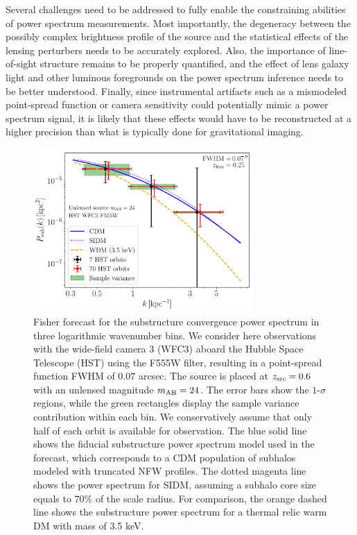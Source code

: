 \documentclass[modern,linenumbers]{aastex62}
\begin{document}
Several challenges need to be addressed to fully enable the constraining abilities of power spectrum measurements. Most importantly, the degeneracy between the possibly complex brightness profile of the source and the statistical effects of the lensing perturbers needs to be accurately explored. Also, the importance of line-of-sight structure remains to be properly quantified, and the effect of lens galaxy light and other luminous foregrounds on the power spectrum inference needs to be better understood. Finally, since instrumental artifacts such as a mismodeled point-spread function or camera sensitivity could potentially mimic a power spectrum signal, it is likely that these effects would have to be reconstructed at a higher precision than what is typically done for gravitational imaging. 

\begin{figure}
\centering
\includegraphics[width=0.75\textwidth]{figures/Fisher_space_Pk_SIDM_rev.pdf}
\caption{Fisher forecast for the substructure convergence power spectrum in three logarithmic wavenumber bins. We consider here observations with the wide-field camera 3 (WFC3) aboard the Hubble Space Telescope (HST) using the F555W filter, resulting in a point-spread function FWHM of $0.07$ arcsec. The source is placed at $z_{\rm src}=0.6$ with an unlensed magnitude $m_{\rm AB}=24$. The error bars show the $1$-$\sigma$ regions, while the green rectangles display the sample variance contribution within each bin. We conservatively assume that only half of each orbit is available for observation. The blue solid line shows the fiducial substructure power spectrum model used in the forecast, which corresponds to a CDM population of subhalos modeled with truncated NFW profiles. The dotted magenta line shows the power spectrum for SIDM, assuming a subhalo core size equals to $70\%$ of the scale radius. For comparison, the orange dashed line shows the substructure power spectrum for a thermal relic warm DM with mass of 3.5 keV. \label{fig:pksub_fisher}}
\end{figure}
\end{document}

